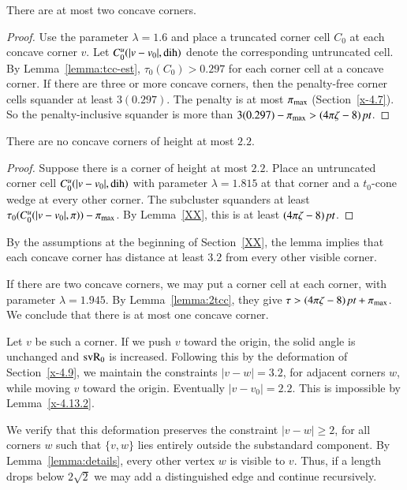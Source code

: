 \begin{lemma}
There are at most two concave corners.
\end{lemma}

\begin{proof}
Use the parameter $\lambda=1.6$ and place a truncated corner cell $C_0$
at each concave corner $v$. Let $C_0^u(|v-v_0|,\operatorname{dih})$ denote the
corresponding untruncated cell.  By Lemma~\ref{lemma:tcc-est},
$\tau_0(C_0) > 0.297$ for each corner cell at a concave corner.
If there are three or more concave corners, then the penalty-free corner
cells squander at least $3(0.297)$. The penalty is at most $\pi_{\max}$
(Section~\ref{x-4.7}). So the penalty-inclusive squander is more than
    $3(0.297) - \pi_{\max} >(4\pi\zeta-8)\,\hbox{\it pt}$.
\end{proof}

\begin{lemma}
There are no concave corners of height at most $2.2$.
\end{lemma}

\begin{proof}
Suppose there is a corner of height at most $2.2$. Place an
untruncated corner cell $C^u_0(|v-v_0|,\operatorname{dih})$ with parameter $\lambda
=1.815$ at that corner and a $t_0$-cone wedge at every other corner. 
The
subcluster squanders at least
    $\tau_0(C^u_0(|v-v_0|,\pi))-\pi_{\max}$.
By Lemma~\ref{XX}, this is at least $(4\pi\zeta-8)\,\hbox{\it pt}$.
\end{proof}

By the assumptions at the beginning of Section~\ref{XX}, the lemma
implies that each concave corner has distance at least $3.2$ from every
other visible corner.

If there are two concave corners, we may put a corner cell at
each corner, with parameter $\lambda=1.945$.  By Lemma~\ref{lemma:2tcc},
they give $\tau > (4\pi\zeta-8)\,\hbox{\it pt} + \pi_{\max}$.
We conclude that there is at most one concave corner. 

Let $v$ be such a
corner.   
If we push $v$ toward the origin, the solid angle is unchanged
and ${\operatorname{svR}}_0$ is increased.  Following this by the deformation of
Section~\ref{x-4.9}, we maintain the constraints $|v-w|=3.2$, for
adjacent corners $w$, while moving $v$ toward the origin. Eventually
$|v-v_0|=2.2$. This is impossible by Lemma~\ref{x-4.13.2}.

We verify that this deformation preserves the constraint
$|v-w|\ge2$, for all corners $w$ such that $\{v,w\}$ lies entirely
outside the substandard component.  
By Lemma~\ref{lemma:details}, every other vertex $w$
is visible to $v$.  Thus, if a length drops below $2\sqrt2$ we may
add a distinguished edge and continue recursively.

